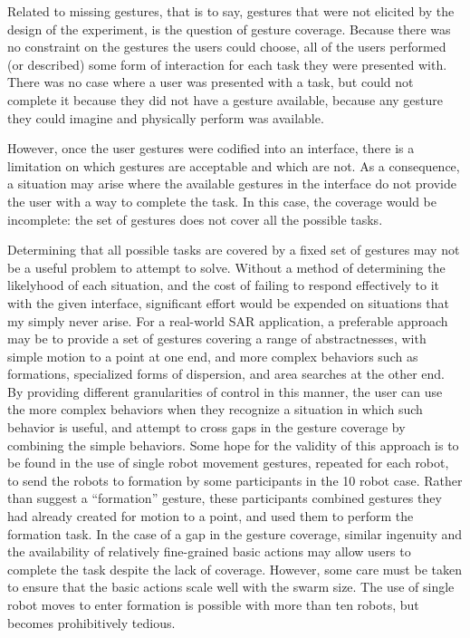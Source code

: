 Related to missing gestures, that is to say, gestures that were not elicited by the design of the experiment, is the question of gesture coverage. 
Because  there was no constraint on the gestures the users could choose, all of the users performed (or described) some form of interaction for each task they were presented with. 
There was no case where a user was presented with a task, but could not complete it because they did not have a gesture available, because any gesture they could imagine and physically perform was available. 

However, once the user gestures were codified into an interface, there is a limitation on which gestures are acceptable and which are not. 
As a consequence, a situation may arise where the available gestures in the interface do not provide the user with a way to complete the task. 
In this case, the coverage would be incomplete: the set of gestures does not cover all the possible tasks. 

Determining that all possible tasks are covered by a fixed set of gestures may not be a useful problem to attempt to solve. 
Without a method of determining the likelyhood of each situation, and the cost of failing to respond effectively to it with the given interface, significant effort would be expended on situations that my simply never arise. 
For a real-world SAR application, a preferable approach may be to provide a set of gestures covering a range of abstractnesses, with simple motion to a point at one end, and more complex behaviors such as formations, specialized forms of dispersion, and area searches at the other end. 
By providing different granularities of control in this manner, the user can use the more complex behaviors when they recognize a situation in which such behavior is useful, and attempt to cross gaps in the gesture coverage by combining the simple behaviors. 
Some hope for the validity of this approach is to be found in the use of single robot movement gestures, repeated for each robot, to send the robots to formation by some participants in the 10 robot case. 
Rather than suggest a ``formation'' gesture, these participants combined gestures they had already created for motion to a point, and used them to perform the formation task. 
In the case of a gap in the gesture coverage, similar ingenuity and the availability of relatively fine-grained basic actions may allow users to complete the task despite the lack of coverage. 
However, some care must be taken to ensure that the basic actions scale well with the swarm size. 
The use of single robot moves to enter formation is possible with more than ten robots, but becomes prohibitively tedious. 